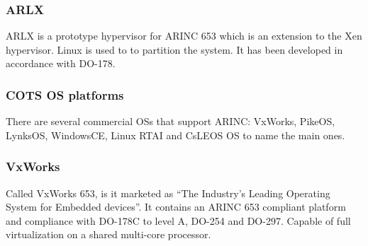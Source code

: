 \subsubsection{ARLX}
ARLX is a prototype hypervisor for ARINC 653 which is an extension to the Xen hypervisor.
Linux is used to to partition the system.
It has been developed in accordance with DO-178.

\subsubsection{COTS OS platforms}
There are several commercial OSs that support ARINC:
VxWorks, PikeOS, LynksOS, WindowsCE, Linux RTAI and CsLEOS OS to name the main ones.

\subsubsection{VxWorks}
Called VxWorks 653, is it marketed as ``The Industry's Leading Operating System for Embedded devices''.
It contains an ARINC 653 compliant platform and compliance with DO-178C to level A, DO-254 and DO-297.
Capable of full virtualization on a shared multi-core processor.
